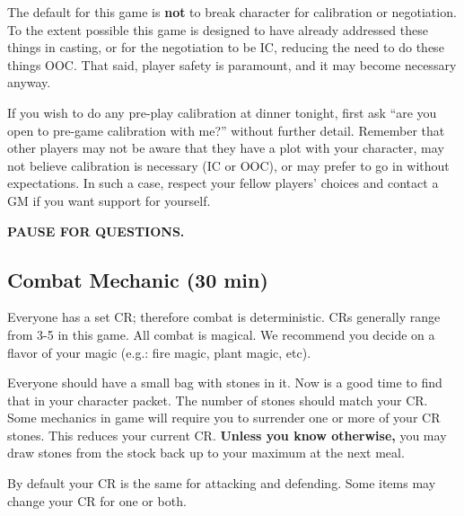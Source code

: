 \documentclass[green]{GL2020}
\begin{document}
The default for this game is \textbf{not} to break character for calibration or negotiation. To the extent possible this game is designed to have already addressed these things in casting, or for the negotiation to be IC, reducing the need to do these things OOC. That said, player safety is paramount, and it may become necessary anyway.

If you wish to do any pre-play calibration at dinner tonight, first ask ``are you open to pre-game calibration with me?'' without further detail.  Remember that other players may not be aware that they have a plot with your character, may not believe calibration is necessary (IC or OOC), or may prefer to go in without expectations. In such a case, respect your fellow players' choices and contact a GM if you want support for yourself.

\textbf{PAUSE FOR QUESTIONS.}

\subsection*{Combat Mechanic (30 min)}
Everyone has a set CR; therefore combat is deterministic. CRs generally range from 3-5 in this game. All combat is magical. We recommend you decide on a flavor of your magic (e.g.: fire magic, plant magic, etc).

Everyone should have a small bag with stones in it. Now is a good time to find that in your character packet. The number of stones should match your CR. Some mechanics in game will require you to surrender one or more of your CR stones. This reduces your current CR. \textbf{Unless you know otherwise,} you may draw stones from the stock back up to your maximum at the next meal.

By default your CR is the same for attacking and defending. Some items may change your CR for one or both.
\end{document}
